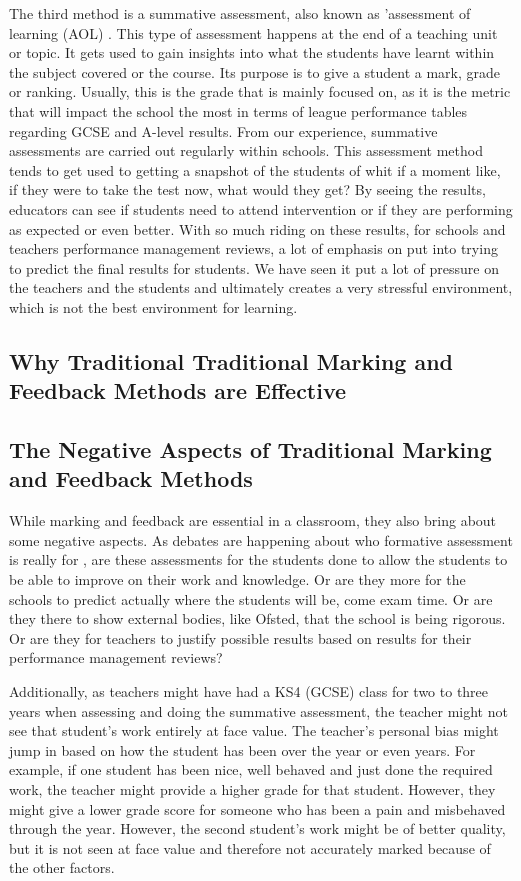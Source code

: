 	The third method is a summative assessment, also known as 'assessment of learning (AOL) \cite{wellington2007secondary}. This type of assessment happens at the end of a teaching unit or topic. It gets used to gain insights into what the students have learnt within the subject covered or the course. Its purpose is to give a student a mark, grade or ranking. Usually, this is the grade that is mainly focused on, as it is the metric that will impact the school the most in terms of league performance tables regarding GCSE and A-level results. From our experience, summative assessments are carried out regularly within schools. This assessment method tends to get used to getting a snapshot of the students of whit if a moment like, if they were to take the test now, what would they get? By seeing the results, educators can see if students need to attend intervention or if they are performing as expected or even better. With so much riding on these results, for schools and teachers performance management reviews, a lot of emphasis on put into trying to predict the final results for students. We have seen it put a lot of pressure on the teachers and the students and ultimately creates a very stressful environment, which is not the best environment for learning.
	
	
	
	
	\subsection{Why Traditional Traditional Marking and Feedback Methods are Effective}
	
	
	\subsection{The Negative Aspects of Traditional Marking and Feedback Methods}
		
		While marking and feedback are essential in a classroom, they also bring about some negative aspects. As debates are happening about who formative assessment is really for \cite{wellington2007secondary}, are these assessments for the students done to allow the students to be able to improve on their work and knowledge. Or are they more for the schools to predict actually where the students will be, come exam time. Or are they there to show external bodies, like Ofsted, that the school is being rigorous. Or are they for teachers to justify possible results based on results for their performance management reviews?
		
		Additionally, as teachers might have had a KS4 (GCSE) class for two to three years when assessing and doing the summative assessment, the teacher might not see that student's work entirely at face value. The teacher's personal bias might jump in based on how the student has been over the year or even years. For example, if one student has been nice, well behaved and just done the required work, the teacher might provide a higher grade for that student. However, they might give a lower grade score for someone who has been a pain and misbehaved through the year. However, the second student's work might be of better quality, but it is not seen at face value and therefore not accurately marked because of the other factors.
		
